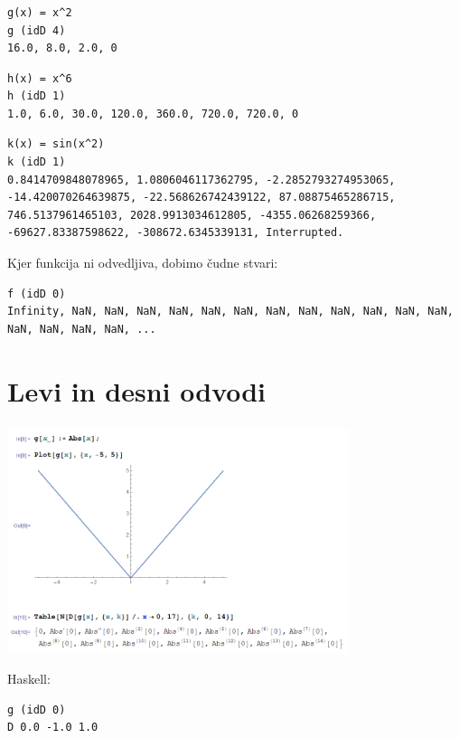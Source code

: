 \documentclass[9pt,table]{beamer}
\begin{document}
\begin{frame}[fragile]
\frametitle{}
\pause
\begin{verbatim}
g(x) = x^2
g (idD 4)
16.0, 8.0, 2.0, 0
\end{verbatim}\pause
\begin{verbatim}
h(x) = x^6
h (idD 1)
1.0, 6.0, 30.0, 120.0, 360.0, 720.0, 720.0, 0
\end{verbatim}\pause
\begin{verbatim}
k(x) = sin(x^2)
k (idD 1)
0.8414709848078965, 1.0806046117362795, -2.2852793274953065, 
-14.420070264639875, -22.568626742439122, 87.08875465286715, 
746.5137961465103, 2028.9913034612805, -4355.06268259366, 
-69627.83387598622, -308672.6345339131, Interrupted.
\end{verbatim}\pause
Kjer funkcija ni odvedljiva, dobimo čudne stvari:\pause
\begin{verbatim}
f (idD 0)
Infinity, NaN, NaN, NaN, NaN, NaN, NaN, NaN, NaN, NaN, NaN, NaN, NaN, 
NaN, NaN, NaN, NaN, ...
\end{verbatim}
\end{frame}


\section{Levi in desni odvodi}

\begin{frame}[fragile]
\frametitle{}
\includegraphics[width=10cm]{graf3.png}

\pause
Haskell:
\begin{verbatim}
g (idD 0)
D 0.0 -1.0 1.0
\end{verbatim}
\end{frame}
\end{document}
